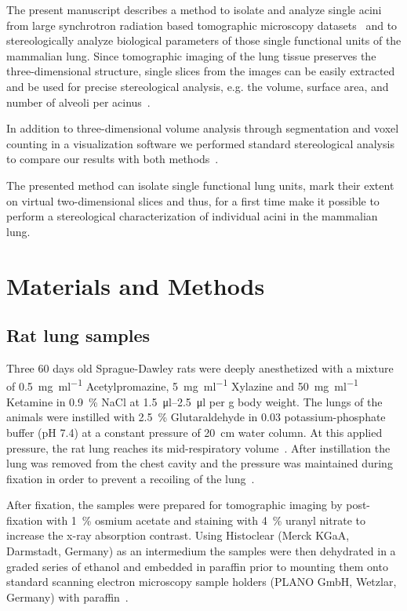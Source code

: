 \documentclass[a4paper,DIVcalc,abstract,english]{scrartcl}
\begin{document}
The present manuscript describes a method to isolate and analyze single acini from large synchrotron radiation based tomographic microscopy datasets~\cite{Haberthuer2010a} and to stereologically analyze biological parameters of those single functional units of the mammalian lung.
Since tomographic imaging of the lung tissue preserves the three-dimensional structure, single slices from the images can be easily extracted and be used for precise stereological analysis, e.g. the volume, surface area, and number of alveoli per acinus~\cite{Hsia2010}.

In addition to three-dimensional volume analysis through segmentation and voxel counting in a visualization software we performed standard stereological analysis~\cite{Hsia2010} to compare our results with both methods~\cite{Rodriguez1987,Tschanz2003}.

The presented method can isolate single functional lung units, mark their extent on virtual two-dimensional slices and thus, for a first time make it possible to perform a stereological characterization of individual acini in the mammalian lung.

\section{Materials and Methods\label{sec:materials and methods}}
\subsection{Rat lung samples}
Three 60 days old Sprague-Dawley rats were deeply anesthetized with a mixture of %
\SI{0.5}{\milli\gram\per\milli\litre} Acetylpromazine, %
\SI{5}{\milli\gram\per\milli\litre} Xylazine and %
\SI{50}{\milli\gram\per\milli\litre} Ketamine in %
\SI{0.9}{\percent} NaCl at \SIrange{1.5}{2.5}{\micro\litre} per \si{\gram} body weight.
The lungs of the animals were instilled with \SI{2.5}{\percent} Glutaraldehyde in \SI{0.03}{\Molar} potassium-phosphate buffer (pH 7.4) at a constant pressure of \SI{20}{\centi\meter} water column.
At this applied pressure, the rat lung reaches its mid-respiratory volume~\cite{Schittny1998}.
After instillation the lung was removed from the chest cavity and the pressure was maintained during fixation in order to prevent a recoiling of the lung~\cite{Schittny2008}.

After fixation, the samples were prepared for tomographic imaging by post-fixation with \SI{1}{\percent} osmium acetate and staining with \SI{4}{\percent} uranyl nitrate to increase the x-ray absorption contrast.
Using Histoclear (Merck KGaA, Darmstadt, Germany) as an intermedium the samples were then dehydrated in a graded series of ethanol and embedded in paraffin prior to mounting them onto standard scanning electron microscopy sample holders (PLANO GmbH, Wetzlar, Germany) with paraffin~\cite{Tsuda2008}.
\end{document}

